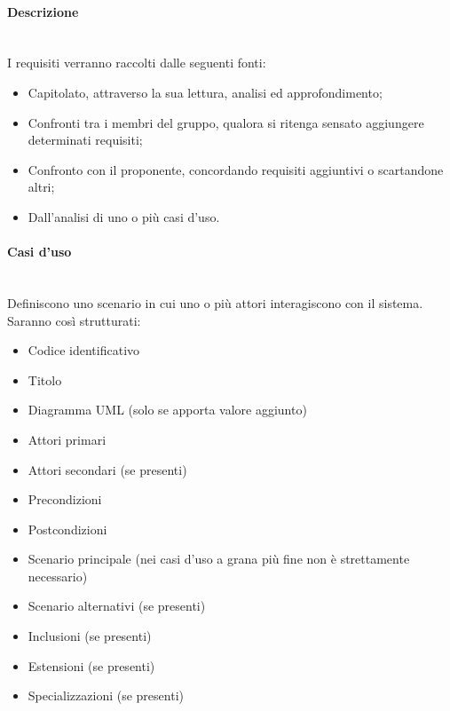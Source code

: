 \paragraph{Descrizione}\mbox{}\\
I requisiti verranno raccolti dalle seguenti fonti:
\begin{itemize}
\item Capitolato, attraverso la sua lettura, analisi ed approfondimento;
\item Confronti tra i membri del gruppo, qualora si ritenga sensato aggiungere determinati requisiti;
\item Confronto con il proponente, concordando requisiti aggiuntivi o scartandone altri;
\item Dall’analisi di uno o più casi d’uso.
\end{itemize}

\paragraph{Casi d'uso}\mbox{}\\
Definiscono uno scenario in cui uno o più attori interagiscono con il sistema. Saranno così strutturati:
\begin{itemize}
\item Codice identificativo
\item Titolo
\item Diagramma UML (solo se apporta valore aggiunto)
\item Attori primari
\item Attori secondari (se presenti)
\item Precondizioni
\item Postcondizioni
\item Scenario principale (nei casi d’uso a grana più fine non è strettamente necessario)
\item Scenario alternativi (se presenti)
\item Inclusioni (se presenti)
\item Estensioni (se presenti)
\item Specializzazioni (se presenti)
\end{itemize}
